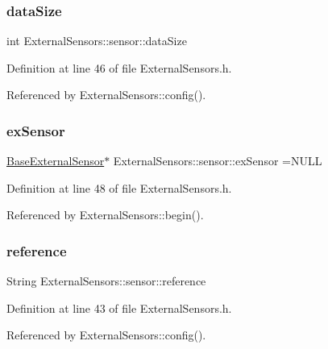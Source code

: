 \subsubsection{\texorpdfstring{data\+Size}{dataSize}}
{\footnotesize\ttfamily int External\+Sensors\+::sensor\+::data\+Size}



Definition at line 46 of file External\+Sensors.\+h.



Referenced by External\+Sensors\+::config().

\mbox{\label{structExternalSensors_1_1sensor_a9bca150fd468b8d0e090e6d72c5c2b48}} 
\subsubsection{\texorpdfstring{ex\+Sensor}{exSensor}}
{\footnotesize\ttfamily \hyperlink{classBaseExternalSensor}{Base\+External\+Sensor}$\ast$ External\+Sensors\+::sensor\+::ex\+Sensor =N\+U\+LL}



Definition at line 48 of file External\+Sensors.\+h.



Referenced by External\+Sensors\+::begin().

\mbox{\label{structExternalSensors_1_1sensor_afed5bdfd49732202a368b600cb8396fe}} 
\subsubsection{\texorpdfstring{reference}{reference}}
{\footnotesize\ttfamily String External\+Sensors\+::sensor\+::reference}



Definition at line 43 of file External\+Sensors.\+h.



Referenced by External\+Sensors\+::config().

\mbox{\label{structExternalSensors_1_1sensor_a6acfdb02c742c2110d7bd2b5d9fce9e7}} 
